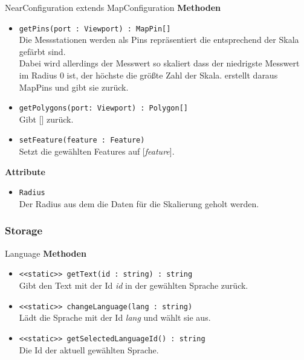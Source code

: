 \begin{Class}{NearConfiguration extends MapConfiguration}
    \textbf{Methoden}
    \begin{itemize}
        \item \texttt{getPins(port : Viewport) : MapPin[]}
        \\ Die Messstationen werden als Pins repräsentiert die entsprechend der Skala gefärbt sind.
        \\ Dabei wird allerdings der Messwert so skaliert dass der niedrigste Messwert im Radius 0 ist, der höchste die größte Zahl der Skala.
        erstellt daraus MapPins und gibt sie zurück.
        \item \texttt{getPolygons(port: Viewport) : Polygon[]}
        \\ Gibt [] zurück.
        \bigskip
        \item \texttt{setFeature(feature : Feature)}
        \\ Setzt die gewählten Features auf [\emph{feature}].
    \end{itemize}
    \textbf{Attribute}
    \begin{itemize}
        \item \texttt{Radius}
        \\ Der Radius aus dem die Daten für die Skalierung geholt werden.
    \end{itemize}
\end{Class}

\subsubsection{Storage}

\begin{Class}{Language}
    \textbf{Methoden}
    \begin{itemize}
        \item \texttt{<<static>> getText(id : string) : string}
        \\ Gibt den Text mit der Id \emph{id} in der gewählten Sprache zurück.
        \item \texttt{<<static>> changeLanguage(lang : string)}
        \\ Lädt die Sprache mit der Id \emph{lang} und wählt sie aus.
        \item \texttt{<<static>> getSelectedLanguageId() : string}
        \\ Die Id der aktuell gewählten Sprache.
    \end{itemize}

\end{Class}


